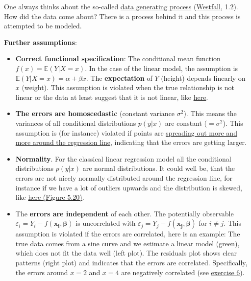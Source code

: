 \documentclass[
]{book}
\begin{document}
One always thinks about the so-called
\href{https://en.wikipedia.org/wiki/Data_generating_process}{data generating process}
(\href{https://www.routledge.com/Understanding-Regression-Analysis-A-Conditional-Distribution-Approach/Westfall-Arias/p/book/9780367493516?srsltid=AfmBOore3O_Ciecl0TTkr9AjPIY1d6OmbQa7o7IAdKpTSkD8s9HkwzD4}{Westfall}, 1.2).
How did the data come about? There is a process behind it and this process
is attempted to be modeled.

\textbf{Further assumptions}:

\begin{itemize}
\item
  \textbf{Correct functional specification}: The conditional mean function \(f(x) = \mathbb{E}(Y|X=x)\).
  In the case of the linear model, the assumption is \(\mathbb{E}(Y|X=x) = \alpha + \beta x\).
  The \textbf{expectation} of \(Y\) (height) depends linearly on \(x\) (weight).
  This assumption is violated when the true relationship is not linear or the
  data at least suggest that it is not linear, like \href{https://www.alexanderdemos.org/Class5_files/figure-html/unnamed-chunk-2-1.png}{here}.
\item
  \textbf{The errors are homoscedastic} (constant variance \(\sigma^2\)). This means the
  variances of all conditional distributions \(p(y|x)\) are constant (\(=\sigma^2\)).
  This assumption is (for instance) violated if points are \href{https://www.investopedia.com/thmb/n9S9lWMv6X9-sKC2DtAOtUTPSik=/1500x0/filters:no_upscale():max_bytes(150000):strip_icc():format(webp)/Heteroskedasticity22-ce5acc2acef6494d91935588b0599579.png}{spreading out more and more
  around the regression line},
  indicating that the errors are getting larger.
\item
  \textbf{Normality}. For the classical linear regression model all the conditional
  distributions \(p(y|x)\) are normal distributions. It could well be, that
  the errors are not nicely normally distributed around the regression line,
  for instance if we have a lot of outliers upwards and the distribution
  is skewed, like \href{https://www.bookdown.org/rwnahhas/RMPH/mlr-normality.html}{here (Figure 5.20)}.
\item
  The \textbf{errors are independent} of each other.
  The potentially observable \(\varepsilon_i = Y_i - f(\mathbf{x_i}, \mathbf{\beta})\)
  is uncorrelated with \(\varepsilon_j = Y_j - f(\mathbf{x_j}, \mathbf{\beta})\) for
  \(i \neq j\). This assumption is violated if the errors are correlated,
  here is an example: The true data comes from a sine curve and we estimate a
  linear model (green), which does not fit the data well (left plot).
  The residuals plot shows clear patterns (right plot) and indicates
  that the errors are correlated. Specifically, the errors around \(x=2\) and \(x=4\)
  are negatively correlated (see \hyperref[exercise6_simpl_lin_reg]{exercise 6}).
\end{itemize}
\end{document}
